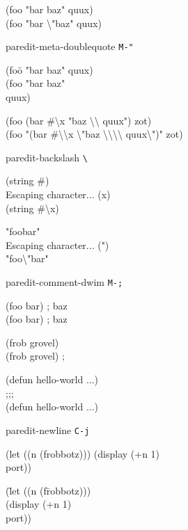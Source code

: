 \documentclass[8pt,landscape,a4paper]{article}
\newenvironment{nstabbing}
  {\setlength{\topsep}{-\parskip}%
   \setlength{\partopsep}{0.2em}%
   \tabbing}
  {\endtabbing}
\begin{document}
\begin{multicols}{4}
{(foo "bar \cursor baz" quux)\\
(foo "bar \textbackslash"\cursor baz" quux)
}

paredit-meta-doublequote \texttt{M-"}

{\ttfamily
\begin{nstabbing}
(foo\={} "bar \cursor baz" quux)\\
(foo "bar baz"\\
\>\cursor quux)
\end{nstabbing}

(foo \cursor(bar \#\textbackslash x "baz \textbackslash\textbackslash{} quux") zot)\\
(foo "\cursor(bar \#\textbackslash\textbackslash x \textbackslash"baz \textbackslash\textbackslash\textbackslash\textbackslash{} quux\textbackslash")" zot)
}

paredit-backslash \texttt{\textbackslash}

{\ttfamily
(string \#\cursor)\\
Escaping character... (x)\\
(string \#\textbackslash x\cursor)

"foo\cursor bar"\\
Escaping character... (")\\
"foo\textbackslash"\cursor bar"
}

paredit-comment-dwim \texttt{M-;}

{\ttfamily
\begin{nstabbing}
(foo \cursor bar) \space ; baz \space \space \space \space \=\\
(foo bar) \>; \cursor baz
\end{nstabbing}

\begin{nstabbing}
(frob grovel)\cursor \space \space \space \space \space \space \space \space\=\\
(frob grovel) \>;\cursor
\end{nstabbing}

\cursor(defun hello-world ...)\\
;;; \cursor\\
(defun hello-world ...)
}

paredit-newline \texttt{C-j}

{\ttfamily
\begin{nstabbing}
(let ((n (frobbotz))) \cursor (display (+n 1)\\
port))
\end{nstabbing}

\begin{nstabbing}
(\=let ((n (f\=robbotz)))\\
\>\cursor (display (+n 1)\\
\>\>
port))
\end{nstabbing}
}


\end{multicols}
\end{document}
